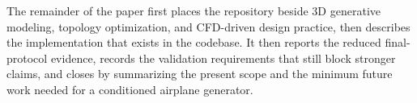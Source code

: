 The remainder of the paper first places the repository beside 3D generative modeling, topology optimization, and CFD-driven design practice, then describes the implementation that exists in the codebase. It then reports the reduced final-protocol evidence, records the validation requirements that still block stronger claims, and closes by summarizing the present scope and the minimum future work needed for a conditioned airplane generator.
